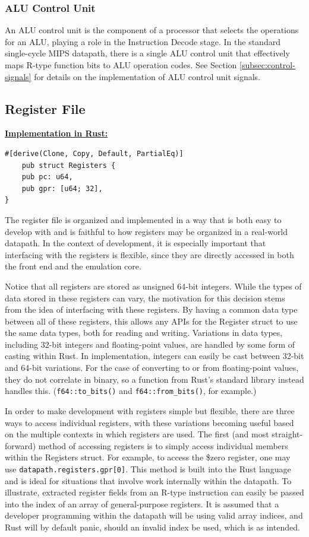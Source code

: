 \documentclass[
    paper=letter,
    parskip=half,
    fontsize=12pt,
    titlepage=firstiscover,
    toc=bibliography,
    numbers=endperiod
]{scrartcl}
\begin{document}
\subsubsection{ALU Control Unit}

An ALU control unit is the component of a processor that selects the
operations for an ALU, playing a role in the Instruction Decode stage.
In the standard single-cycle MIPS datapath, there is a single ALU
control unit that effectively maps R-type function bits to ALU operation
codes. See Section \ref{subsec:control-signals} for details on the
implementation of ALU control unit signals.

\subsection{Register File}

\underline{\textbf{Implementation in Rust:}}
\begin{verbatim}
#[derive(Clone, Copy, Default, PartialEq)]
    pub struct Registers {
    pub pc: u64,
    pub gpr: [u64; 32],
}
\end{verbatim}

The register file is organized and implemented in a way that is both
easy to develop with and is faithful to how registers may be organized
in a real-world datapath. In the context of development, it is
especially important that interfacing with the registers is flexible,
since they are directly accessed in both the front end and the emulation
core.

Notice that all registers are stored as unsigned 64-bit integers. While
the types of data stored in these registers can vary, the motivation for
this decision stems from the idea of interfacing with these registers.
By having a common data type between all of these registers, this allows
any APIs for the Register struct to use the same data types, both for
reading and writing. Variations in data types, including 32-bit integers
and floating-point values, are handled by some form of casting within
Rust. In implementation, integers can easily be cast between 32-bit and
64-bit variations. For the case of converting to or from floating-point
values, they do not correlate in binary, so a function from Rust's
standard library instead handles this. (\texttt{f64::to\_bits()} and
\texttt{f64::from\_bits()}, for example.)

In order to make development with registers simple but flexible, there
are three ways to access individual registers, with these variations
becoming useful based on the multiple contexts in which registers are
used. The first (and most straight-forward) method of accessing
registers is to simply access individual members within the Registers
struct. For example, to access the \$zero register, one may use
\texttt{datapath.registers.gpr[0]}. This method is built into the Rust
language and is ideal for situations that involve work internally within
the datapath. To illustrate, extracted register fields from an R-type
instruction can easily be passed into the index of an array of
general-purpose registers. It is assumed that a developer programming
within the datapath will be using valid array indices, and Rust will by
default panic, should an invalid index be used, which is as intended.
\end{document}
